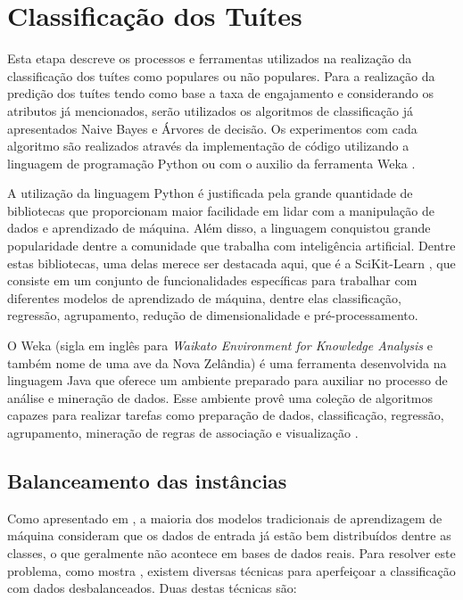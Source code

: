 \documentclass[oneside,openright,12pt]{ufsm_2015} %
\begin{document}
\section{Classificação dos Tuítes}
\label{sec:prop-classificacao}

    \par Esta etapa descreve os processos e ferramentas utilizados na realização da classificação dos tuítes como populares ou não populares. Para a realização da predição dos tuítes tendo como base a taxa de engajamento e considerando os atributos já mencionados, serão utilizados os algoritmos de classificação já apresentados Naive Bayes e Árvores de decisão. Os experimentos com cada algoritmo são realizados através da implementação de código utilizando a linguagem de programação Python \cite{site:python} ou com o auxilio da ferramenta Weka \cite{site:weka}.
    
    \par A utilização da linguagem Python é justificada pela grande quantidade de bibliotecas que proporcionam maior facilidade em lidar com a manipulação de dados e aprendizado de máquina. Além disso, a linguagem conquistou grande popularidade dentre a comunidade que trabalha com inteligência artificial. Dentre estas bibliotecas, uma delas merece ser destacada aqui, que é a SciKit-Learn \cite{site:scikit-learn}, que consiste em um conjunto de funcionalidades específicas para trabalhar com diferentes modelos de aprendizado de máquina, dentre elas classificação, regressão, agrupamento, redução de dimensionalidade e pré-processamento.
    
    \par O Weka (sigla em inglês para \textit{Waikato Environment for Knowledge Analysis} e também nome de uma ave da Nova Zelândia) é uma ferramenta desenvolvida na linguagem Java que oferece um ambiente preparado para auxiliar no processo de análise e mineração de dados. Esse ambiente provê uma coleção de algoritmos capazes para realizar tarefas como preparação de dados, classificação, regressão, agrupamento, mineração de regras de associação e visualização \cite{site:weka}.


\subsection{Balanceamento das instâncias}
\label{sec:prop-class-balanceamento}
    
    \par Como apresentado em \cite{book:han:11}, a maioria dos modelos tradicionais de aprendizagem de máquina consideram que os dados de entrada já estão bem distribuídos dentre as classes, o que geralmente não acontece em bases de dados reais. Para resolver este problema, como mostra \cite{kotsiantis:2006}, existem diversas técnicas para aperfeiçoar a classificação com dados desbalanceados. Duas destas técnicas são: 
    
\end{document}

